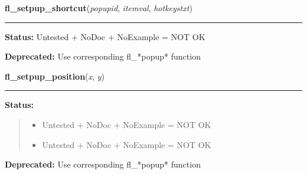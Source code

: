     \vspace{0.5ex}

\hspace{.8\funcindent}\begin{boxedminipage}{\funcwidth}

    \raggedright \textbf{fl\_setpup\_shortcut}(\textit{popupid}, \textit{itemval}, \textit{hotkeystxt})

    \vspace{-1.5ex}

    \rule{\textwidth}{0.5\fboxrule}
\setlength{\parskip}{2ex}
\setlength{\parskip}{1ex}
\textbf{Status:} Untested + NoDoc + NoExample = NOT OK



\textbf{Deprecated:} Use corresponding fl\_*popup* function



    \end{boxedminipage}

    \label{xformslib:library:fl_setpup_position}

    \vspace{0.5ex}

\hspace{.8\funcindent}\begin{boxedminipage}{\funcwidth}

    \raggedright \textbf{fl\_setpup\_position}(\textit{x}, \textit{y})

    \vspace{-1.5ex}

    \rule{\textwidth}{0.5\fboxrule}
\setlength{\parskip}{2ex}
\setlength{\parskip}{1ex}
\textbf{Status:}
\begin{quote}
  \begin{itemize}

  \item
    \setlength{\parskip}{0.6ex}
Untested + NoDoc + NoExample = NOT OK



  \item Untested + NoDoc + NoExample = NOT OK



\end{itemize}

\end{quote}

\textbf{Deprecated:} Use corresponding fl\_*popup* function



    \end{boxedminipage}

